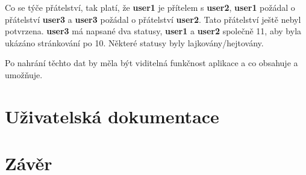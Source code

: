 \documentclass[
12pt,
a4paper,
pdftex,
czech,
titlepage
]{report}
\begin{document}
Co se týče přátelství, tak platí, že \textbf{user1} je přítelem s \textbf{user2}, \textbf{user1} požádal o přátelství \textbf{user3} a \textbf{user3} požádal o přátelství \textbf{user2}. Tato přátelství ještě nebyl potvrzena. \textbf{user3} má napsané dva statusy, \textbf{user1} a \textbf{user2} společně 11, aby byla ukázáno stránkování po 10. Některé statusy byly lajkovány/hejtovány.

Po nahrání těchto dat by měla být viditelná funkčnost aplikace a co obsahuje a umožňuje.

\chapter{Uživatelská dokumentace}


\chapter{Závěr}
\end{document}
